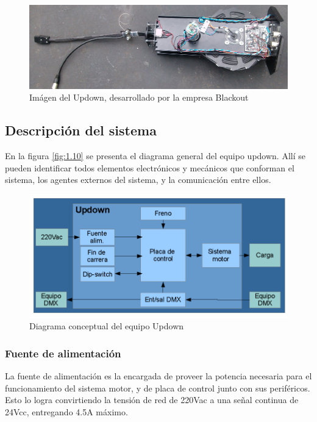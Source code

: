 \begin{figure}[!ht]
	\centering
	\includegraphics[width=15cm,scale=1]{resources/1_9-updown.jpg}
	\caption{Imágen del Updown, desarrollado por la empresa Blackout}
	\label{fig:\thefigure}
\end{figure}
\newpage
\subsection{Descripción del sistema}

En la figura \ref{fig:1.10} se presenta el diagrama general del equipo updown. Allí se pueden identificar todos elementos electrónicos y mecánicos que conforman el sistema, los agentes externos del sistema, y la comunicación entre ellos.

\begin{figure}[!ht]
	\centering
	\includegraphics[width=15cm,scale=1]{resources/1_10-diagramaBasicoUpdown.png}
	\caption{Diagrama conceptual del equipo Updown}
	\label{fig:\thefigure}
\end{figure}

\subsubsection{Fuente de alimentación}
La fuente de alimentación es la encargada de proveer la potencia necesaria para el funcionamiento del sistema motor, y de placa de control junto con sus periféricos. Esto lo logra convirtiendo la tensión de red de 220Vac a una señal continua de 24Vcc, entregando 4.5A máximo.

